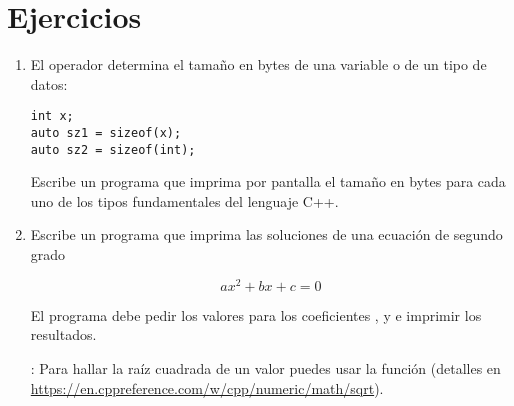 \section{Ejercicios}

\begin{enumerate}

\item El operador  determina el tamaño en bytes de una variable o de
un tipo de datos:

\begin{lstlisting}
int x;
auto sz1 = sizeof(x);
auto sz2 = sizeof(int);
\end{lstlisting}

Escribe un programa que imprima por pantalla el tamaño en bytes para cada uno de los
tipos fundamentales del lenguaje C++.

\item Escribe un programa que imprima las soluciones de una ecuación de segundo grado

\[
a x^2 + b x + c = 0
\]

El programa debe pedir los valores para los coeficientes ,  y
 e imprimir los resultados.

: Para hallar la raíz cuadrada de un valor puedes usar la función
 (detalles en 
\url{https://en.cppreference.com/w/cpp/numeric/math/sqrt}).


\end{enumerate}
